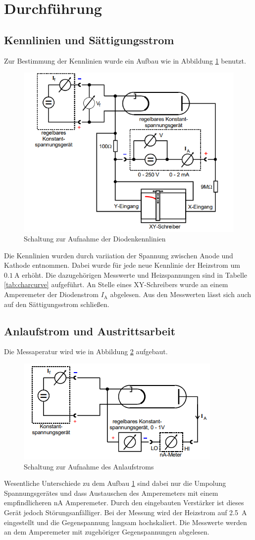 \section{Durchführung}
\label{sec:Durchführung}
\subsection{Kennlinien und Sättigungsstrom}
Zur Bestimmung der Kennlinien wurde ein Aufbau wie in Abbildung \ref{fig:aufbaua} benutzt.
\begin{figure}
    \centering
    \caption{Schaltung zur Aufnahme der Diodenkennlinien \cite{v504}}
    \label{fig:aufbaua}
    \includegraphics[width = 0.5 \textwidth]{pics/Aufbaua.png}
\end{figure}
Die Kennlinien wurden durch variiation der Spannung zwischen Anode und Kathode entnommen. Dabei wurde für jede neue Kennlinie der Heizstrom um $\SI{0.1}{\ampere}$ erhöht.
Die dazugehörigen Messwerte und Heizspannungen sind in Tabelle \ref{tab:charcurve} aufgeführt. 
An Stelle eines XY-Schreibers wurde an einem Amperemeter der Diodenstrom $I_\text{A}$ abgelesen.
Aus den Messwerten lässt sich auch auf den Sättigungsstrom schließen.

\subsection{Anlaufstrom und Austrittsarbeit}
Die Messaperatur wird wie in Abbildung \ref{fig:aufbauc} aufgebaut.
\begin{figure}
    \centering
    \caption{Schaltung zur Aufnahme des Anlaufstroms \cite{v504}}
    \label{fig:aufbauc}
    \includegraphics[width = 0.5 \textwidth]{pics/Aufbauc.png}
\end{figure}
Wesentliche Unterschiede zu dem Aufbau \ref{fig:aufbaua} sind dabei nur die Umpolung Spannungsgerätes und dass Austauschen des Amperemeters mit einem empfindlicheren $\si{\nano\ampere}$ Amperemeter. Durch den eingebauten Verstärker ist dieses Gerät jedoch Störungsanfälliger.
Bei der Messung wird der Heizstrom auf \SI{2.5}{\ampere} eingestellt und die Gegenspannung langsam hochskaliert. Die Messwerte werden an dem Amperemeter mit zugehöriger Gegenspannungen abgelesen.

